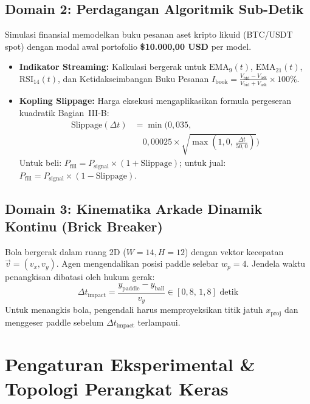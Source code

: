 \documentclass[journal,compsoc]{IEEEtran}
\begin{document}
\subsection{Domain 2: Perdagangan Algoritmik Sub-Detik}
Simulasi finansial memodelkan buku pesanan aset kripto likuid (BTC/USDT spot) dengan modal awal portofolio \textbf{\$10.000,00 USD} per model.
\begin{itemize}
    \item \textbf{Indikator Streaming:} Kalkulasi bergerak untuk $\text{EMA}_9(t)$, $\text{EMA}_{21}(t)$, $\text{RSI}_{14}(t)$, dan Ketidakseimbangan Buku Pesanan $I_{\text{book}} = \frac{V_{\text{bid}} - V_{\text{ask}}}{V_{\text{bid}} + V_{\text{ask}}} \times 100\%$.
    \item \textbf{Kopling Slippage:} Harga eksekusi mengaplikasikan formula pergeseran kuadratik Bagian~III-B:
    \begin{equation}
    \begin{aligned}
    \text{Slippage}(\Delta t) &= \min \Big( 0{,}035, \\
    &\quad 0{,}00025 \times \sqrt{\max\left(1{,}0, \, \frac{\Delta t}{50{,}0}\right)} \Big)
    \end{aligned}
    \end{equation}
    Untuk beli: $P_{\text{fill}} = P_{\text{signal}} \times (1 + \text{Slippage})$; untuk jual: $P_{\text{fill}} = P_{\text{signal}} \times (1 - \text{Slippage})$.
\end{itemize}

\subsection{Domain 3: Kinematika Arkade Dinamik Kontinu (Brick Breaker)}
Bola bergerak dalam ruang 2D ($W = 14, H = 12$) dengan vektor kecepatan $\vec{v} = (v_x, v_y)$. Agen mengendalikan posisi paddle selebar $w_p = 4$. Jendela waktu penangkisan dibatasi oleh hukum gerak:
\begin{equation}
\Delta t_{\text{impact}} = \frac{y_{\text{paddle}} - y_{\text{ball}}}{v_y} \in [0,8, \, 1,8] \text{ detik}
\end{equation}
Untuk menangkis bola, pengendali harus memproyeksikan titik jatuh $x_{\text{proj}}$ dan menggeser paddle sebelum $\Delta t_{\text{impact}}$ terlampaui.

\section{Pengaturan Eksperimental \& Topologi Perangkat Keras}
\end{document}
